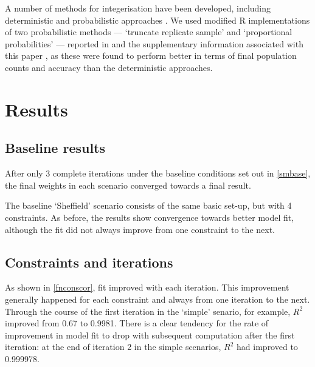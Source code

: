 \documentclass[a4paper,10pt]{article}
\begin{document}
A number of methods for integerisation have been developed,
including deterministic and probabilistic approaches \citep{Ballas2005c}.
We used modified R implementations of two probabilistic methods
--- `truncate replicate sample' and `proportional probabilities' --- reported
in \citep{Lovelace2013-trs} and the supplementary information associated with this
paper \citep{Lovelace-2013-supp}, as these were found to perform better in terms of final
population counts and accuracy than the deterministic approaches.
  

\section{Results}
\label{cresults}

\subsection{Baseline results}

After only 3 complete iterations under the baseline conditions
set out in \cref{smbase}, the final weights in each scenario
converged towards a final result.

The baseline `Sheffield' scenario consists of the same basic set-up, 
but with 4 constraints. As before, the results show convergence 
towards better model fit, although the fit did not always improve 
from one constraint to the next.


\subsection{Constraints and iterations}
As shown in \cref{fnconscor}, fit
improved with each iteration.
This improvement generally happened for each constraint 
and always from one iteration to the next.
Through the course of the first 
iteration in the `simple' senario, for example, $R^2$ improved
from 0.67 to 0.9981. There is a clear tendency for the rate of improvement
in model fit to drop with subsequent computation after the first iteration: 
at the end of iteration 2 in the simple scenarios, $R^2$ had improved to 0.999978.   
\end{document}
